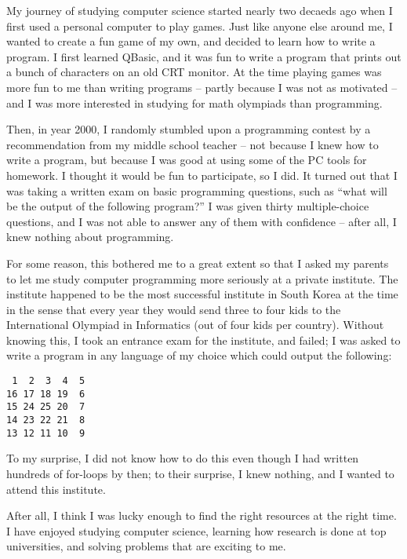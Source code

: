 
My journey of studying computer science started nearly two decaeds ago when I first used a personal computer to play games. Just like anyone else around me, I wanted to create a fun game of my own, and decided to learn how to write a program. I first learned QBasic, and it was fun to write a program that prints out a bunch of characters on an old CRT monitor. At the time playing games was more fun to me than writing programs -- partly because I was not as motivated -- and I was more interested in studying for math olympiads than programming.

Then, in year 2000, I randomly stumbled upon a programming contest by a recommendation from my middle school teacher -- not because I knew how to write a program, but because I was good at using some of the PC tools for homework. I thought it would be fun to participate, so I did. It turned out that I was taking a written exam on basic programming questions, such as ``what will be the output of the following program?'' I was given thirty multiple-choice questions, and I was not able to answer any of them with confidence  -- after all, I knew nothing about programming.

For some reason, this bothered me to a great extent so that I asked my parents to let me study computer programming more seriously at a private institute. The institute happened to be the most successful institute in South Korea at the time in the sense that every year they would send three to four kids to the International Olympiad in Informatics (out of four kids per country). Without knowing this, I took an entrance exam for the institute, and failed; I was asked to write a program in any language of my choice which could output the following:

\begin{verbatim}
 1  2  3  4  5
16 17 18 19  6
15 24 25 20  7
14 23 22 21  8
13 12 11 10  9
\end{verbatim}

To my surprise, I did not know how to do this even though I had written hundreds of for-loops by then; to their surprise, I knew nothing, and I wanted to attend this institute. 



After all, I think I was lucky enough to find the right resources at the right time.  I have enjoyed studying computer science, learning how research is done at top universities, and solving problems that are exciting to me.


